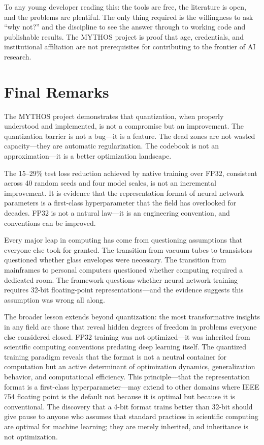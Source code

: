 To any young developer reading this: the tools are free, the literature is open, and the problems are plentiful. The only thing required is the willingness to ask ``why not?'' and the discipline to see the answer through to working code and publishable results. The MYTHOS project is proof that age, credentials, and institutional affiliation are not prerequisites for contributing to the frontier of AI research.

\section{Final Remarks}
\label{sec:final}

The MYTHOS project demonstrates that quantization, when properly understood and implemented, is not a compromise but an improvement. The quantization barrier is not a bug---it is a feature. The dead zones are not wasted capacity---they are automatic regularization. The codebook is not an approximation---it is a better optimization landscape.

The 15--29\% test loss reduction achieved by native \OIL{} training over FP32, consistent across 40 random seeds and four model scales, is not an incremental improvement. It is evidence that the representation format of neural network parameters is a first-class hyperparameter that the field has overlooked for decades. FP32 is not a natural law---it is an engineering convention, and conventions can be improved.

Every major leap in computing has come from questioning assumptions that everyone else took for granted. The transition from vacuum tubes to transistors questioned whether glass envelopes were necessary. The transition from mainframes to personal computers questioned whether computing required a dedicated room. The \OIL{} framework questions whether neural network training requires 32-bit floating-point representations---and the evidence suggests this assumption was wrong all along.

The broader lesson extends beyond quantization: the most transformative insights in any field are those that reveal hidden degrees of freedom in problems everyone else considered closed. FP32 training was not optimized---it was inherited from scientific computing conventions predating deep learning itself. The quantized training paradigm reveals that the format is not a neutral container for computation but an active determinant of optimization dynamics, generalization behavior, and computational efficiency. This principle---that the representation format is a first-class hyperparameter---may extend to other domains where IEEE 754 floating point is the default not because it is optimal but because it is conventional. The discovery that a 4-bit format trains better than 32-bit should give pause to anyone who assumes that standard practices in scientific computing are optimal for machine learning; they are merely inherited, and inheritance is not optimization.

